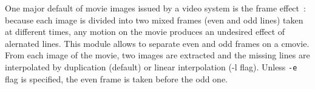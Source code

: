 One major default of movie images issued by a video system is the frame 
effect~: because each image is
divided into two mixed frames (even and odd lines) taken at different times, 
any motion on the movie produces an undesired effect of alernated lines.
This module allows to separate even and odd frames on a cmovie. From each image
of the movie, two images are extracted and the missing lines
are interpolated by duplication (default) or linear interpolation (-l flag).
Unless \verb+-e+ flag is specified, the even frame is taken before the odd one.
